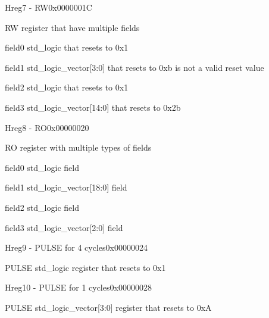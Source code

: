 \documentclass{article}
\begin{document}
\begin{register}{H}{reg7 - RW}{0x0000001C}  \par RW register that have multiple fields \regnewline
  \label{reg7}
\regnewline
  \begin{regdesc}\begin{reglist}[field0]
    \item [field0] std{\_}logic that resets to 0x1    \item [field1] std{\_}logic{\_}vector[3:0] that resets to 0xb is not a valid reset value    \item [field2] std{\_}logic that resets to 0x1    \item [field3] std{\_}logic{\_}vector[14:0] that resets to 0x2b  \end{reglist}\end{regdesc}
\end{register}

\begin{register}{H}{reg8 - RO}{0x00000020}  \par RO register with multiple types of fields \regnewline
  \label{reg8}
\regnewline
  \begin{regdesc}\begin{reglist}[field0]
    \item [field0] std{\_}logic field    \item [field1] std{\_}logic{\_}vector[18:0] field    \item [field2] std{\_}logic field    \item [field3] std{\_}logic{\_}vector[2:0] field  \end{reglist}\end{regdesc}
\end{register}

\begin{register}{H}{reg9 - PULSE for 4 cycles}{0x00000024}  \par PULSE std{\_}logic register that resets to 0x1 \regnewline
  \label{reg9}
\regnewline
\end{register}

\begin{register}{H}{reg10 - PULSE for 1 cycles}{0x00000028}  \par PULSE std{\_}logic{\_}vector[3:0] register that resets to 0xA \regnewline
  \label{reg10}
\regnewline
\end{register}
\end{document}
